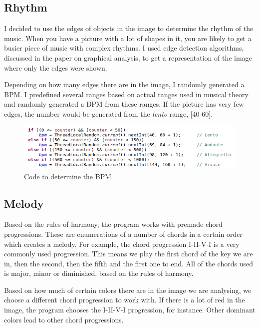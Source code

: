 \documentclass[12pt]{article}
\begin{document}
\subsection{Rhythm}

I decided to use the edges of objects in the image to determine the rhythm of the music. When you have a picture with a lot of shapes in it, you are likely to get a busier piece of music with complex rhythms. I used edge detection algorithms, discussed in the paper on graphical analysis, to get a representation of the image where only the edges were shown.

Depending on how many edges there are in the image, I randomly generated a BPM. I predefined several ranges based on actual ranges used in musical theory and randomly generated a BPM from these ranges.
If the picture has very few edges, the number would be generated from the \textit{lento} range, [40-60].

\begin{figure}[h]
\centering
\hbox{\hspace{-1.3em}\includegraphics[scale=0.7]{img/bpm_code}}
\caption{Code to determine the BPM}
\end{figure}

\subsection{Melody}

Based on the rules of harmony, the program works with premade chord progressions. These are enumerations of a number of chords in a certain order which creates a melody. For example, the chord progression I-II-V-I is a very commonly used progression. This means we play the first chord of the key we are in, then the second, then the fifth and the first one to end. All of the chords used is major, minor or diminished, based on the rules of harmony.
\newline

Based on how much of certain colors there are in the image we are analysing, we choose a different chord progression to work with. If there is a lot of red in the image, the program chooses the I-II-V-I progression, for instance. Other dominant colors lead to other chord progressions.
\newline
\end{document}
